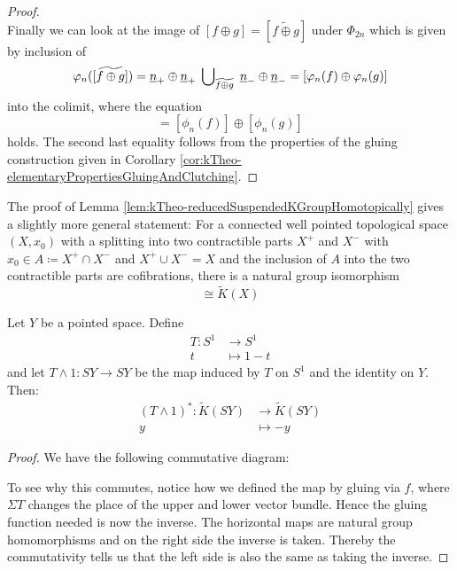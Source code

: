 \begin{proof}
\begin{equation}
	\end{equation} Finally we can look at the image of $[f\oplus g]=[\widetilde{f\oplus g}]$ under $\Phi_{2n}$ which is given by inclusion of
	\begin{equation*}
		\varphi_n([\widetilde{f\oplus g}])=\underline{n}_+\oplus \underline{n}_+ \; \bigcup\nolimits_{\widetilde{f\oplus g}} \; \underline{n}_-\oplus \underline{n}_-=[\varphi_n(f)\oplus \varphi_n(g)]
	\end{equation*} into the colimit, where the equation
	\begin{equation*}
	[\phi_n(f)\oplus \phi_n(g)]=[\phi_n(f)]\oplus [\phi_n(g)]
	\end{equation*} holds. The second last equality follows from the properties of the gluing construction given in Corollary \ref{cor:kTheo-elementaryPropertiesGluingAndClutching}.
\end{proof}
\begin{remark}
	The proof of Lemma \ref{lem:kTheo-reducedSuspendedKGroupHomotopically} gives a slightly more general statement:
	For a connected well pointed topological space $(X,x_0)$ with a splitting into two contractible parts $X^+$ and $X^-$ with $x_0\in A\coloneq X^+\cap X^-$ and $X^+\cup X^-=X$ and the inclusion of $A$ into the two contractible parts are cofibrations, there is a natural group isomorphism
	\begin{equation*}
		[A,U]\cong \tilde{K}(X)
	\end{equation*} 
\end{remark}
\begin{corollary}\label{lem:kTheo-inversesInKGivenByHomotopicallyMethods}
		Let $Y$ be a pointed space. Define
		\begin{align*}
			T:S^1 &\to S^1 \\
			t     &\mapsto 1-t
		\end{align*} and let $T\wedge1:SY\to SY$ be the map induced by $T$ on $S^1$ and the identity on $Y$. Then:
		\begin{align*}
			(T\wedge1)^*:\tilde{K}(SY)   &\to \tilde{K}(SY)\\
			y                           &\mapsto -y
		\end{align*}
\end{corollary}
\begin{proof}
	We have the following commutative diagram: 
	\begin{center}
	\end{center} To see why this commutes, notice how we defined the map by gluing via $f$, where $\Sigma T$ changes the place of the upper and lower vector bundle. Hence the gluing function needed is now the inverse. 
	The horizontal maps are natural group homomorphisms and on the right side the inverse is taken. Thereby the commutativity tells us that the left side is also the same as taking the inverse.
\end{proof}
